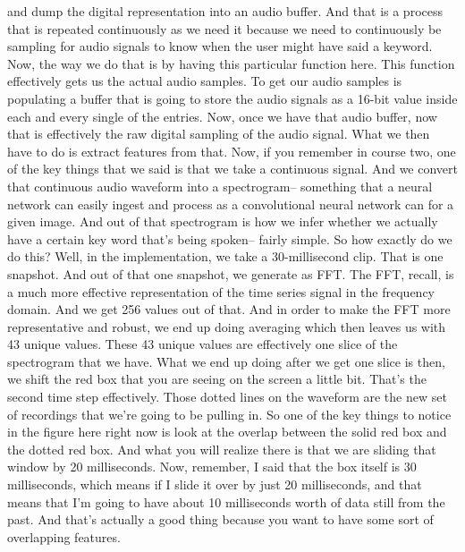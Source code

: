      and dump the digital representation into an audio buffer.
     And that is a process that is repeated continuously
     as we need it because we need to continuously
     be sampling for audio signals to know when
     the user might have said a keyword.
     Now, the way we do that is by having this particular function here.
     This function effectively gets us the actual audio samples.
     To get our audio samples is populating a buffer
     that is going to store the audio signals as a 16-bit value inside each and every
     single of the entries.
     Now, once we have that audio buffer, now that
     is effectively the raw digital sampling of the audio signal.
     What we then have to do is extract features from that.
     Now, if you remember in course two, one of the key things that we said
     is that we take a continuous signal.
     And we convert that continuous audio waveform into a spectrogram-- something
     that a neural network can easily ingest and process
     as a convolutional neural network can for a given image.
     And out of that spectrogram is how we infer
     whether we actually have a certain key word that's being spoken--
     fairly simple.
     So how exactly do we do this?
     Well, in the implementation, we take a 30-millisecond clip.
     That is one snapshot.
     And out of that one snapshot, we generate as FFT.
     The FFT, recall, is a much more effective representation
     of the time series signal in the frequency domain.
     And we get 256 values out of that.
     And in order to make the FFT more representative and robust,
     we end up doing averaging which then leaves us with 43 unique values.
     These 43 unique values are effectively one slice of the spectrogram
     that we have.
     What we end up doing after we get one slice is then,
     we shift the red box that you are seeing on the screen a little bit.
     That's the second time step effectively.
     Those dotted lines on the waveform are the new set of recordings
     that we're going to be pulling in.
     So one of the key things to notice in the figure here right now
     is look at the overlap between the solid red box and the dotted red box.
     And what you will realize there is that we are
     sliding that window by 20 milliseconds.
     Now, remember, I said that the box itself
     is 30 milliseconds, which means if I slide it over by just 20 milliseconds,
     and that means that I'm going to have about 10 milliseconds worth of data
     still from the past.
     And that's actually a good thing because you
     want to have some sort of overlapping features.
